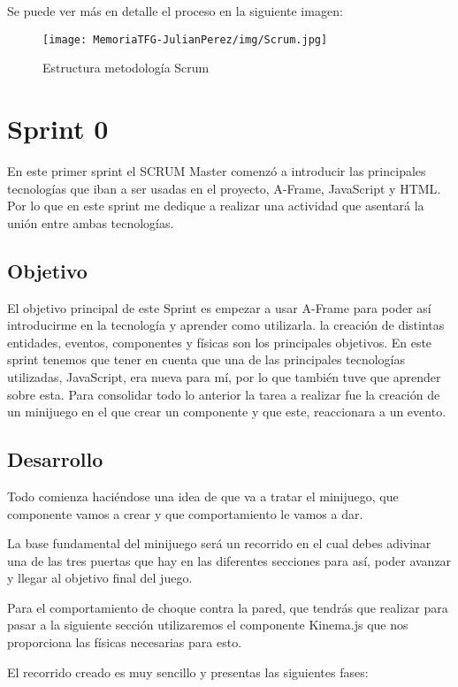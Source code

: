 \documentclass[a4paper, 12pt]{book}
\begin{document}
Se puede ver más en detalle el proceso en la siguiente imagen:
\begin{figure}[H]
  \centering
  \texttt{[image: MemoriaTFG-JulianPerez/img/Scrum.jpg]}
  \caption{Estructura metodología Scrum}\label{scrum}
\end{figure}

\section{Sprint 0} %
\label{sec:sprint0}
En este primer sprint el SCRUM Master comenzó a introducir las principales tecnologías que iban a ser usadas en el proyecto, A-Frame, JavaScript y HTML. Por lo que en este sprint me dedique a realizar una actividad que asentará la unión entre ambas tecnologías.

\subsection{Objetivo}
El objetivo principal de este Sprint es empezar a usar A-Frame para poder así introducirme en la tecnología y aprender como utilizarla. la creación de distintas entidades, eventos, componentes y físicas son los principales objetivos. En este sprint tenemos que tener en cuenta que una de las principales tecnologías utilizadas, JavaScript, era nueva para mí, por lo que también tuve que aprender sobre esta. Para consolidar todo lo anterior la tarea a realizar fue la creación de un minijuego en el que crear un componente y que este, reaccionara a un evento.

\subsection{Desarrollo}
Todo comienza haciéndose una idea de que va a tratar el minijuego, que componente vamos a crear y que comportamiento le vamos a dar.

La base fundamental del minijuego será un recorrido en el cual debes adivinar una de las tres puertas que hay en las diferentes secciones para así, poder avanzar y llegar al objetivo final del juego.

Para el comportamiento de choque contra la pared, que tendrás que realizar para pasar a la siguiente sección utilizaremos el componente Kinema.js que nos proporciona las físicas necesarias para esto. 

El recorrido creado es muy sencillo y presentas las siguientes fases:
\end{document}
